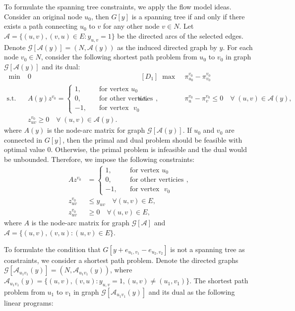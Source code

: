 \documentclass[11pt]{article}
\newcommand{\G}{\mathcal{G}}
\newcommand{\Aa}{\mathcal{A}}
\begin{document}
To formulate the spanning tree constraints, we apply the flow model ideas. Consider an original node $u_0$, then $G[y]$ is a spanning tree if and only if there exists a path connecting $u_0$ to $v$ for any other node $v \in N$. Let $\Aa = \{(u, v), (v, u)\in E: y_{u,v} = 1\}$ be the directed arcs of the selected edges. Denote $\G[\Aa(y)] = (N, \Aa(y))$ as the induced directed graph by $y$. For each node $v_0\in N$, consider the following shortest path problem from $u_0$ to $v_0$ in graph $\G[\Aa(y)]$ and its dual:
\begin{align*}
[P_1]\;\min\;& 0 \hspace{50pt} &\; [D_1]\; \max\; &\pi_{u_0}^{v_0} - \pi_{v_0}^{v_0} \\
\text{s.t.~~}& A(y)z^{v_0} = \begin{cases}
1, \quad & \text{for vertex~} u_0 \\
0, \quad & \text{for other verticies} \\
-1, \quad & \text{for vertex ~} v_0
\end{cases}, & \text{s.t.~~}& \pi_{u}^{v_0} - \pi_{v}^{v_0} \leq 0\quad\forall\; (u, v) \in \Aa(y),\\
& z_{uv}^{v_0} \geq 0 \quad\forall \; (u, v)\in \Aa(y). && 
\end{align*}
where $A(y)$ is the node-arc matrix for graph $\G[\Aa(y)]$. If $u_0$ and $v_0$ are connected in $G[y]$, then the primal and dual problem should be feasible with optimal value $0$. Otherwise, the primal problem is infeasible and the dual would be unbounded. Therefore, we impose the following constraints:
\begin{subequations} \label{eq:mst_s0}
	\begin{align}
	Az^{v_0} & = \begin{cases}
	1, \quad & \text{for vertex~} u_0 \\
	0, \quad & \text{for other verticies} \\
	-1, \quad & \text{for vertex ~} v_0
	\end{cases}, \\
	z_{uv}^{v_0} & \leq y_{uv} \quad  \forall (u,v) \in E,\\
	z_{uv}^{v_0} & \geq 0  \quad  \forall (u,v) \in E,
	\end{align}
\end{subequations}
where $A$ is the node-arc matrix for graph $\G[\Aa]$ and $\Aa = \{(u,v), (v, u): (u,v)\in E \}$.


To formulate the condition that $G[y + e_{u_1,v_1} - e_{u_2,v_2}]$ is not a spanning tree as constraints, we consider a shortest path problem. Denote the directed graphs $\G[\Aa_{u_1v_1}(y)] = (N, \Aa_{u_1v_1}(y))$, where $\Aa_{u_1v_1}(y) = \{(u,v), (v, u): y_{u,v}=1, (u,v)\neq (u_1, v_1)\}$. The shortest path problem from $u_1$ to $v_1$ in graph $\G[\Aa_{u_1v_1}(y)]$ and its dual as the following linear programs:
\end{document}
